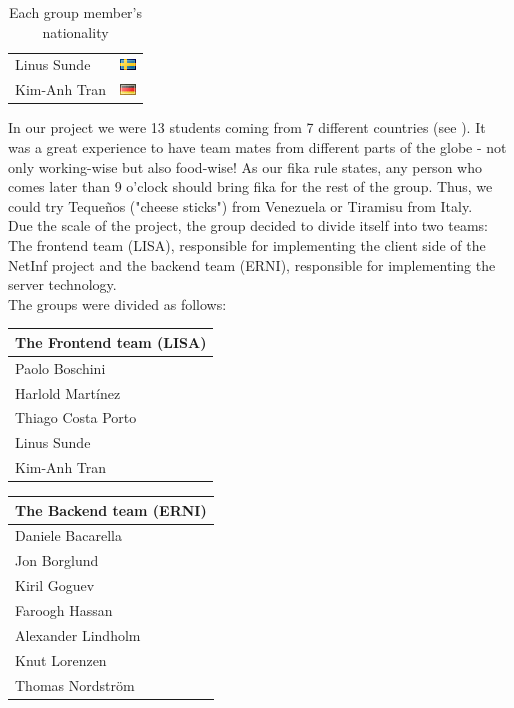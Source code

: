 \begin{table}
\begin{tabular}{|l|c|}
Linus Sunde & \includegraphics{graphics/se.png} \\
Kim-Anh Tran & \includegraphics{graphics/de.png} \\
\hline
\end{tabular}
\caption{Each group member's nationality}\label{tab:nationality}
\end{table}

In our project we were 13 students coming from 7 different countries (see ).
It was a great experience to have team mates from different parts of the globe - not
only working-wise but also food-wise! As our fika rule states, any person who comes later
than 9 o'clock should bring fika for the rest of the group. Thus, we could
try Teque\~{n}os ("cheese sticks") from Venezuela or Tiramisu from Italy.\\

Due the scale of the project, the group decided to divide itself into two teams: 
The frontend team (LISA), responsible for implementing the client side of the NetInf project and the backend team (ERNI), responsible for implementing the server technology.\\

The groups were divided as follows:

\begin{minipage}[b]{0.32\hsize}\centering
\begin{tabular}{l}
The Frontend team (LISA) \\\hline
Paolo Boschini\\
Harlold Mart\'{i}nez\\
Thiago Costa Porto\\
Linus Sunde\\
Kim-Anh Tran
\end{tabular}
\end{minipage}
\hfill
\begin{minipage}[b]{0.32\hsize}\centering
\begin{tabular}{l}
The Backend team (ERNI) \\\hline
Daniele Bacarella\\
Jon Borglund\\
Kiril Goguev\\
Faroogh Hassan\\
Alexander Lindholm\\
Knut Lorenzen\\
Thomas Nordstr\"om
\end{tabular}
\end{minipage}

